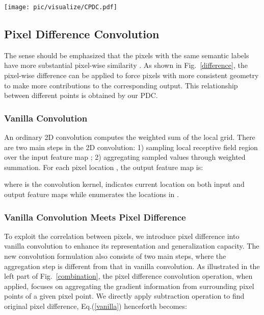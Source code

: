 \documentclass[lettersize,journal]{IEEEtran}
\begin{document}
\begin{figure*} \centering
    \texttt{[image: pic/visualize/CPDC.pdf]}
    \caption{The structure of PDC (left) and PDC (right). Without loss of
generality, we show the  convolution kernel for the PDC and the  convolution kernel with dilation of 2 for the PDC. The operation combining PDC and PDC contributes the CPDC.}
    \label{combination}
\end{figure*}


\subsection{Pixel Difference Convolution}
\label{sec-DDCA}
The sense should be emphasized that the pixels with the same semantic labels have more substantial pixel-wise similarity \cite{zhang2020supervised}. As shown in Fig.~\ref{difference}, the pixel-wise difference can be applied to force pixels with more consistent
geometry to make more contributions to the corresponding output. This relationship between different points is obtained by our PDC.
\iffalse It is essential to produce an attention map that shows the importance of different points in the attention mechanism. \fi  


\subsubsection{Vanilla Convolution}
An ordinary 2D convolution computes the weighted sum of the local grid. There
are two main steps in the 2D convolution: 1) sampling local receptive ﬁeld region  over the input feature map ;
2) aggregating sampled values through weighted summation.
For each pixel location , the output feature map  is:


where  is the convolution kernel,  indicates current location on both input and output feature maps while  enumerates the locations in .
\iffalse
Given a local patch ; H, W, and C are the height, width and the channel of input feature map, respectively. The vanilla convolution is calculated as:

where  is the learnable weight of the convolution kernels with the size of  (the bias terms are ignored for simplicity). 
\fi

\subsubsection{Vanilla Convolution Meets Pixel Difference}
To exploit the correlation between pixels, we introduce pixel difference into vanilla convolution to enhance its representation and generalization capacity. The new convolution formulation also consists of two main steps, where the aggregation step is different from that in vanilla convolution. As illustrated in the left part of Fig.~\ref{combination}, the pixel difference convolution operation, when applied, focuses on aggregating the gradient information from surrounding pixel points of a given pixel point. We directly apply subtraction operation to find original pixel difference, Eq.(\ref{vanilla}) henceforth becomes:
\end{document}
